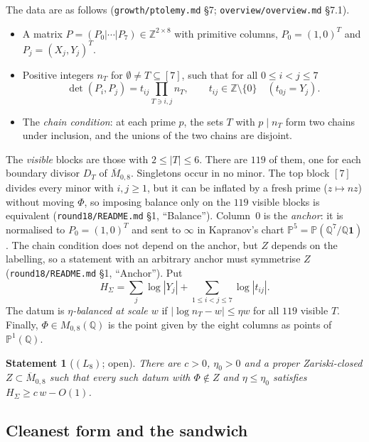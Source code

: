 \documentclass[11pt]{article}
\newtheorem{statement}[theorem]{Statement}
\newcommand{\Z}{\mathbb Z}
\newcommand{\Q}{\mathbb Q}
\newcommand{\PP}{\mathbb P}
\newcommand{\Mbar}{\overline M_{0,8}}
\newcommand{\rec}[1]{\texttt{#1}}
\begin{document}
The data are as follows (\rec{growth/ptolemy.md} \S7;
\rec{overview/overview.md} \S7.1).
\begin{itemize}[leftmargin=2em]
  \item A matrix \(P=(P_0|\cdots|P_7)\in\Z^{2\times8}\) with primitive
    columns, \(P_0=(1,0)^T\) and \(P_j=(X_j,Y_j)^T\).
  \item Positive integers \(n_T\) for \(\emptyset\ne T\subseteq[7]\), such
    that for all \(0\le i<j\le7\)
    \[
      \det(P_i,P_j)=t_{ij}\prod_{T\ni i,j}n_T,\qquad
      t_{ij}\in\Z\setminus\{0\}\quad(t_{0j}=Y_j).
    \]
  \item The \emph{chain condition}: at each prime \(p\), the sets \(T\) with
    \(p\mid n_T\) form two chains under inclusion, and the unions of the two
    chains are disjoint.
\end{itemize}
The \emph{visible} blocks are those with \(2\le|T|\le6\).  There are \(119\)
of them, one for each boundary divisor \(D_T\) of \(\Mbar\).  Singletons occur
in no minor.  The top block \([7]\) divides every minor with \(i,j\ge1\), but
it can be inflated by a fresh prime (\(z\mapsto nz\)) without moving \(\Phi\),
so imposing balance only on the \(119\) visible blocks is equivalent
(\rec{round18/README.md} \S1, ``Balance'').  Column~\(0\) is the
\emph{anchor}: it is normalised to \(P_0=(1,0)^T\) and sent to \(\infty\) in
Kapranov's chart \(\PP^5=\PP(\Q^7/\Q\mathbf 1)\).  The chain condition does
not depend on the anchor, but \(Z\) depends on the labelling, so a statement
with an arbitrary anchor must symmetrise \(Z\) (\rec{round18/README.md} \S1,
``Anchor'').  Put
\[
  H_\Sigma=\sum_j\log|Y_j|+\sum_{1\le i<j\le7}\log|t_{ij}| .
\]
The datum is \emph{\(\eta\)-balanced at scale \(w\)} if \(|\log n_T-w|\le\eta w\)
for all \(119\) visible \(T\).  Finally, \(\Phi\in M_{0,8}(\Q)\) is the point
given by the eight columns as points of \(\PP^1(\Q)\).

\begin{statement}[\((L_8)\); open]\label{st:L8}
There are \(c>0\), \(\eta_0>0\) and a proper Zariski-closed \(Z\subset\Mbar\)
such that every such datum with \(\Phi\notin Z\) and \(\eta\le\eta_0\)
satisfies \(H_\Sigma\ge c\,w-O(1)\).
\end{statement}

\subsection{Cleanest form and the sandwich}
\end{document}
